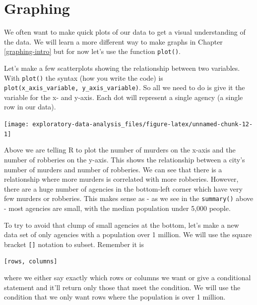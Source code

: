 \documentclass[
  12pt,
]{book}
\newenvironment{Shaded}{\begin{snugshade}}{\end{snugshade}}
\newcommand{\KeywordTok}[1]{\textcolor[rgb]{0.13,0.29,0.53}{\textbf{#1}}}
\newcommand{\NormalTok}[1]{#1}
\newcommand{\OperatorTok}[1]{\textcolor[rgb]{0.81,0.36,0.00}{\textbf{#1}}}
\begin{document}
\hypertarget{graphing}{%
\section{Graphing}\label{graphing}}

We often want to make quick plots of our data to get a visual understanding of the data. We will learn a more different way to make graphs in Chapter \ref{graphing-intro} but for now let's use the function \texttt{plot()}.

Let's make a few scatterplots showing the relationship between two variables. With \texttt{plot()} the syntax (how you write the code) is \texttt{plot(x\_axis\_variable,\ y\_axis\_variable)}. So all we need to do is give it the variable for the x- and y-axis. Each dot will represent a single agency (a single row in our data).

\begin{Shaded}
\end{Shaded}

\begin{center}\texttt{[image: exploratory-data-analysis\_files/figure-latex/unnamed-chunk-12-1]} \end{center}

Above we are telling R to plot the number of murders on the x-axis and the number of robberies on the y-axis. This shows the relationship between a city's number of murders and number of robberies. We can see that there is a relationship where more murders is correlated with more robberies. However, there are a huge number of agencies in the bottom-left corner which have very few murders or robberies. This makes sense as - as we see in the \texttt{summary()} above - most agencies are small, with the median population under 5,000 people.

To try to avoid that clump of small agencies at the bottom, let's make a new data set of only agencies with a population over 1 million. We will use the square bracket \texttt{{[}{]}} notation to subset. Remember it is

\texttt{{[}rows,\ columns{]}}

where we either say exactly which rows or columns we want or give a conditional statement and it'll return only those that meet the condition. We will use the condition that we only want rows where the population is over 1 million.
\end{document}
